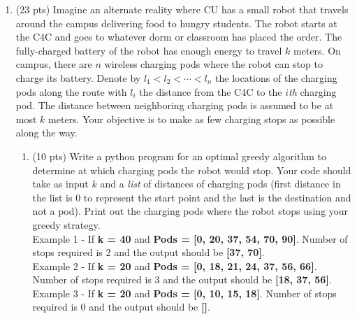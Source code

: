 \documentclass[12pt]{article}
\theoremstyle{remark}
\begin{document}
\hrulefill

\newpage
\begin{enumerate}

\item (23 pts) Imagine an alternate reality where CU has a small robot that travels around the campus delivering food to hungry students. The robot starts at the C4C and goes to whatever dorm or classroom has placed the order. The fully-charged battery of the robot has enough energy to travel $k$ meters. On campus, there are $n$ wireless charging pods where the robot can stop to charge its battery. Denote by $l_1 < l_2 < \cdots < l_n$  the locations of the charging pods along the route with $l_i$ the distance from the C4C to the $i${\em th} charging pod. The distance between neighboring charging pods is assumed to be at most $k$ meters. Your objective is to make as few charging stops as possible along the way. 
\begin{enumerate}
\item (10 pts) Write a python program for an optimal greedy algorithm to determine at which charging pods the robot would stop. Your code should take as input $k$ and a \textit{list} of distances of charging pods (first distance in the list is 0 to represent the start point and the last is the destination and not a pod). Print out the charging pods where the robot stops using your greedy strategy.\\
Example 1 - If \textbf{k = 40} and \textbf{Pods = [0, 20, 37, 54, 70, 90]}. Number of stops required is 2 and the output should be \textbf{[37, 70]}.\\
Example 2 - If \textbf{k = 20} and \textbf{Pods = [0, 18, 21, 24, 37, 56, 66]}. Number of stops required is 3 and the output should be \textbf{[18, 37, 56]}.\\
Example 3 - If \textbf{k = 20} and \textbf{Pods = [0, 10, 15, 18]}. Number of stops required is 0 and the output should be \textbf{[]}.\\




\end{enumerate}
\end{enumerate}
\end{document}
